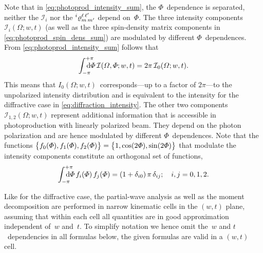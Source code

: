 Note that in \cref{eq:photoprod_intensity_sum}, the $\Phi$~dependence
is separated, \ie neither the $\mathcal{I}_i$ nor the
$\prescript{i}{}{\varrho}^{\ell\, \ell'}_{m\, m'}$ depend on~$\Phi$.
The three intensity components $\mathcal{I}_i(\Omega; w, t)$ (as well
as the three spin-density matrix components in
\cref{eq:photoprod_spin_dens_sum}) are modulated by different
$\Phi$~dependences.  From \cref{eq:photoprod_intensity_sum} follows
that
\begin{equation}
  \label{eq:photoprod_unpolarized_intensity}
  \int_{-\pi}^{+\pi}\hspace{-1.2em} \dif{\Phi}\, \mathcal{I}(\Omega, \Phi; w, t)
  = 2 \pi\, \mathcal{I}_0(\Omega; w, t).
\end{equation}
This means that $I_0(\Omega; w, t)$~corresponds---up to a factor of $2
\pi$---to the unpolarized intensity distribution and is equivalent to
the intensity for the diffractive case in
\cref{eq:diffraction_intensity}.  The other two components
$\mathcal{I}_{1, 2}(\Omega; w, t)$ represent additional information
that is accessible in photoproduction with linearly polarized beam.
They depend on the photon polarization and are hence modulated by
different $\Phi$~dependences.  Note that the functions
$\cBrk[1]{f_0(\Phi), f_1(\Phi), f_2(\Phi)} = \cBrk[1]{1, \cos(2 \Phi),
\sin(2 \Phi)}$ that modulate the intensity components constitute an
orthogonal set of functions, \ie
\begin{equation}
  \label{eq:photoprod_orthogonality_phi}
  \int_{-\pi}^{+\pi}\hspace{-1.2em} \dif{\Phi}\, f_i(\Phi)\, f_j(\Phi)
  = (1 + \delta_{i 0})\, \pi\, \delta_{i j};
  \quad i, j = 0 ,1, 2.
\end{equation}

Like for the diffractive case, the partial-wave analysis as well as
the moment decomposition are performed in narrow kinematic cells in
the $(w, t)$ plane, assuming that within each cell all quantities are
in good approximation independent of~$w$ and~$t$.  To simplify
notation we hence omit the~$w$ and $t$~dependencies in all formulas
below, \ie the given formulas are valid in a $(w, t)$ cell.

